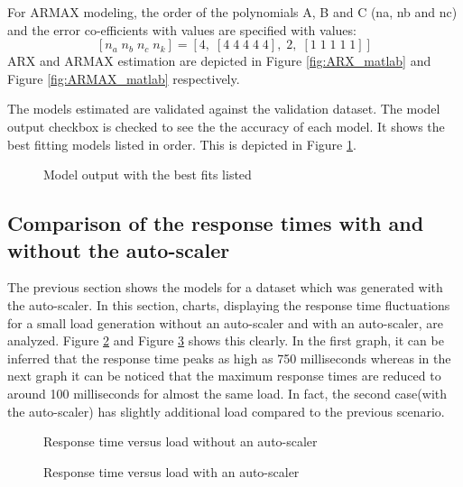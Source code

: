 \documentclass[article,type=msc,colorback,12pt,accentcolor=tud8b,table]{tudthesis}
\begin{document}
	For ARMAX modeling, the order of the polynomials A, B and C (na, nb and nc) and the error co-efficients with values are specified with values: $$ [n_a\; n_b\; n_c\; n_k] = [ 4,\; [ 4\; 4\; 4\; 4\; 4 ], \;2,\; [ 1\; 1\; 1\; 1\; 1 ] ]$$ ARX and ARMAX estimation are depicted in Figure \ref{fig:ARX_matlab} and Figure \ref{fig:ARMAX_matlab} respectively.

	The models estimated are validated against the validation dataset. The model output checkbox is checked to see the the accuracy of each model. It shows the best fitting models listed in order. This is depicted in Figure \ref{fig:model_output}.
   \begin{figure}[H]
		    	\begin{center}
		    		\makebox[\textwidth]{\texttt{[image: E14]}}
		    	\end{center}
		    	\caption{Model output with the best fits listed}
		    		\label{fig:model_output}
   \end{figure}
\subsection{Comparison of the response times with and without the auto-scaler}
The previous section shows the models for a dataset which was generated with the auto-scaler. In this section, charts, displaying the response time fluctuations for a small load generation without an auto-scaler and with an auto-scaler, are analyzed. Figure \ref{fig:without_autoscaler} and Figure \ref{fig:with_autoscaler} shows this clearly. In the first graph, it can be inferred that the response time peaks as high as 750 milliseconds whereas in the next graph it can be noticed that the maximum response times are reduced to around 100 milliseconds for almost the same load. In fact, the second case(with the auto-scaler) has slightly additional load compared to the previous scenario.

   \begin{figure}[H]
   	\begin{center}
   		\makebox[\textwidth]{\texttt{[image: E15]}}
   	\end{center}
   	\caption{Response time versus load without an auto-scaler}
   		\label{fig:without_autoscaler}
   \end{figure}
   
      \begin{figure}[H]
      	\begin{center}
      		\makebox[\textwidth]{\texttt{[image: E16]}}
      	\end{center}
      	\caption{Response time versus load with an auto-scaler}
      		\label{fig:with_autoscaler}
      \end{figure}
\end{document}
